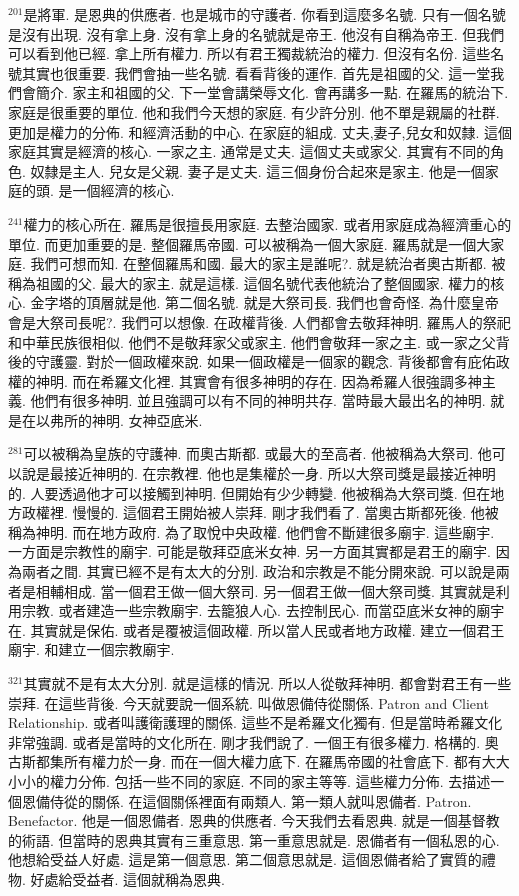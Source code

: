 \documentclass{book}
\begin{document}
$^{201}$是將軍.
是恩典的供應者.
也是城市的守護者.
你看到這麼多名號.
只有一個名號是沒有出現.
沒有拿上身.
沒有拿上身的名號就是帝王.
他沒有自稱為帝王.
但我們可以看到他已經.
拿上所有權力.
所以有君王獨裁統治的權力.
但沒有名份.
這些名號其實也很重要.
我們會抽一些名號.
看看背後的運作.
首先是祖國的父.
這一堂我們會簡介.
家主和祖國的父.
下一堂會講榮辱文化.
會再講多一點.
在羅馬的統治下.
家庭是很重要的單位.
他和我們今天想的家庭.
有少許分別.
他不單是親屬的社群.
更加是權力的分佈.
和經濟活動的中心.
在家庭的組成.
丈夫,妻子,兒女和奴隸.
這個家庭其實是經濟的核心.
一家之主.
通常是丈夫.
這個丈夫或家父.
其實有不同的角色.
奴隸是主人.
兒女是父親.
妻子是丈夫.
這三個身份合起來是家主.
他是一個家庭的頭.
是一個經濟的核心.

$^{241}$權力的核心所在.
羅馬是很擅長用家庭.
去整治國家.
或者用家庭成為經濟重心的單位.
而更加重要的是.
整個羅馬帝國.
可以被稱為一個大家庭.
羅馬就是一個大家庭.
我們可想而知.
在整個羅馬和國.
最大的家主是誰呢?.
就是統治者奧古斯都.
被稱為祖國的父.
最大的家主.
就是這樣.
這個名號代表他統治了整個國家.
權力的核心.
金字塔的頂層就是他.
第二個名號.
就是大祭司長.
我們也會奇怪.
為什麼皇帝會是大祭司長呢?.
我們可以想像.
在政權背後.
人們都會去敬拜神明.
羅馬人的祭祀和中華民族很相似.
他們不是敬拜家父或家主.
他們會敬拜一家之主.
或一家之父背後的守護靈.
對於一個政權來說.
如果一個政權是一個家的觀念.
背後都會有庇佑政權的神明.
而在希羅文化裡.
其實會有很多神明的存在.
因為希羅人很強調多神主義.
他們有很多神明.
並且強調可以有不同的神明共存.
當時最大最出名的神明.
就是在以弗所的神明.
女神亞底米.

$^{281}$可以被稱為皇族的守護神.
而奧古斯都.
或最大的至高者.
他被稱為大祭司.
他可以說是最接近神明的.
在宗教裡.
他也是集權於一身.
所以大祭司獎是最接近神明的.
人要透過他才可以接觸到神明.
但開始有少少轉變.
他被稱為大祭司獎.
但在地方政權裡.
慢慢的.
這個君王開始被人崇拜.
剛才我們看了.
當奧古斯都死後.
他被稱為神明.
而在地方政府.
為了取悅中央政權.
他們會不斷建很多廟宇.
這些廟宇.
一方面是宗教性的廟宇.
可能是敬拜亞底米女神.
另一方面其實都是君王的廟宇.
因為兩者之間.
其實已經不是有太大的分別.
政治和宗教是不能分開來說.
可以說是兩者是相輔相成.
當一個君王做一個大祭司.
另一個君王做一個大祭司獎.
其實就是利用宗教.
或者建造一些宗教廟宇.
去籠狼人心.
去控制民心.
而當亞底米女神的廟宇在.
其實就是保佑.
或者是覆被這個政權.
所以當人民或者地方政權.
建立一個君王廟宇.
和建立一個宗教廟宇.

$^{321}$其實就不是有太大分別.
就是這樣的情況.
所以人從敬拜神明.
都會對君王有一些崇拜.
在這些背後.
今天就要說一個系統.
叫做恩備侍從關係.
Patron and Client Relationship.
或者叫護衛護理的關係.
這些不是希羅文化獨有.
但是當時希羅文化非常強調.
或者是當時的文化所在.
剛才我們說了.
一個王有很多權力.
格構的.
奧古斯都集所有權力於一身.
而在一個大權力底下.
在羅馬帝國的社會底下.
都有大大小小的權力分佈.
包括一些不同的家庭.
不同的家主等等.
這些權力分佈.
去描述一個恩備侍從的關係.
在這個關係裡面有兩類人.
第一類人就叫恩備者.
Patron.
Benefactor.
他是一個恩備者.
恩典的供應者.
今天我們去看恩典.
就是一個基督教的術語.
但當時的恩典其實有三重意思.
第一重意思就是.
恩備者有一個私恩的心.
他想給受益人好處.
這是第一個意思.
第二個意思就是.
這個恩備者給了實質的禮物.
好處給受益者.
這個就稱為恩典.
\end{document}
